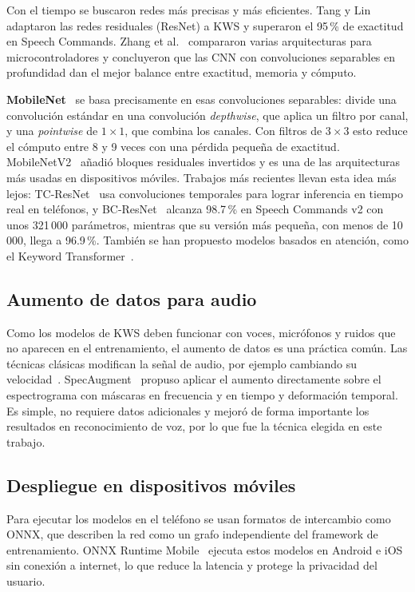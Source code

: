 \documentclass[conference]{IEEEtran}
\begin{document}
Con el tiempo se buscaron redes más precisas y más eficientes. Tang y Lin~\cite{tang2018} adaptaron las redes residuales (ResNet) a KWS y superaron el 95\,\% de exactitud en Speech Commands. Zhang et al.~\cite{zhang2017} compararon varias arquitecturas para microcontroladores y concluyeron que las CNN con convoluciones separables en profundidad dan el mejor balance entre exactitud, memoria y cómputo.

\textbf{MobileNet}~\cite{howard2017} se basa precisamente en esas convoluciones separables: divide una convolución estándar en una convolución \textit{depthwise}, que aplica un filtro por canal, y una \textit{pointwise} de $1\times1$, que combina los canales. Con filtros de $3\times3$ esto reduce el cómputo entre 8 y 9 veces con una pérdida pequeña de exactitud. MobileNetV2~\cite{sandler2018} añadió bloques residuales invertidos y es una de las arquitecturas más usadas en dispositivos móviles. Trabajos más recientes llevan esta idea más lejos: TC-ResNet~\cite{choi2019} usa convoluciones temporales para lograr inferencia en tiempo real en teléfonos, y BC-ResNet~\cite{kim2021} alcanza 98.7\,\% en Speech Commands v2 con unos 321\,000 parámetros, mientras que su versión más pequeña, con menos de 10\,000, llega a 96.9\,\%. También se han propuesto modelos basados en atención, como el Keyword Transformer~\cite{berg2021}.

\subsection{Aumento de datos para audio}
Como los modelos de KWS deben funcionar con voces, micrófonos y ruidos que no aparecen en el entrenamiento, el aumento de datos es una práctica común. Las técnicas clásicas modifican la señal de audio, por ejemplo cambiando su velocidad~\cite{ko2015}. SpecAugment~\cite{park2019} propuso aplicar el aumento directamente sobre el espectrograma con máscaras en frecuencia y en tiempo y deformación temporal. Es simple, no requiere datos adicionales y mejoró de forma importante los resultados en reconocimiento de voz, por lo que fue la técnica elegida en este trabajo.

\subsection{Despliegue en dispositivos móviles}
Para ejecutar los modelos en el teléfono se usan formatos de intercambio como ONNX, que describen la red como un grafo independiente del framework de entrenamiento. ONNX Runtime Mobile~\cite{onnxruntime} ejecuta estos modelos en Android e iOS sin conexión a internet, lo que reduce la latencia y protege la privacidad del usuario.
\end{document}
